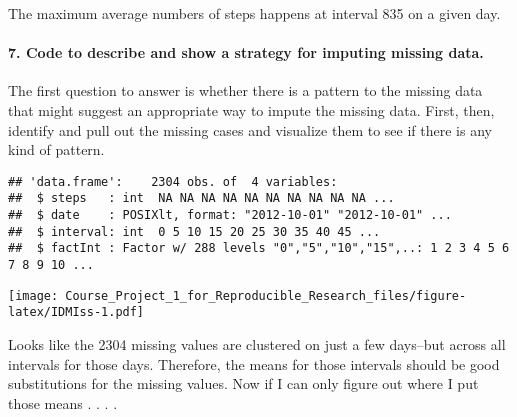 \documentclass[]{article}
\newenvironment{Shaded}{\begin{snugshade}}{\end{snugshade}}
\newcommand{\KeywordTok}[1]{\textcolor[rgb]{0.13,0.29,0.53}{\textbf{#1}}}
\newcommand{\DataTypeTok}[1]{\textcolor[rgb]{0.13,0.29,0.53}{#1}}
\newcommand{\StringTok}[1]{\textcolor[rgb]{0.31,0.60,0.02}{#1}}
\newcommand{\OperatorTok}[1]{\textcolor[rgb]{0.81,0.36,0.00}{\textbf{#1}}}
\newcommand{\NormalTok}[1]{#1}
\let\oldparagraph\paragraph
\renewcommand{\paragraph}[1]{\oldparagraph{#1}\mbox{}}
\begin{document}
The maximum average numbers of steps happens at interval 835 on a given
day.

\paragraph{7. Code to describe and show a strategy for imputing missing
data.}\label{code-to-describe-and-show-a-strategy-for-imputing-missing-data.}

The first question to answer is whether there is a pattern to the
missing data that might suggest an appropriate way to impute the missing
data. First, then, identify and pull out the missing cases and visualize
them to see if there is any kind of pattern.

\begin{Shaded}
\end{Shaded}

\begin{verbatim}
## 'data.frame':    2304 obs. of  4 variables:
##  $ steps   : int  NA NA NA NA NA NA NA NA NA NA ...
##  $ date    : POSIXlt, format: "2012-10-01" "2012-10-01" ...
##  $ interval: int  0 5 10 15 20 25 30 35 40 45 ...
##  $ factInt : Factor w/ 288 levels "0","5","10","15",..: 1 2 3 4 5 6 7 8 9 10 ...
\end{verbatim}

\begin{Shaded}
\end{Shaded}

\texttt{[image: Course\_Project\_1\_for\_Reproducible\_Research\_files/figure-latex/IDMIss-1.pdf]}

Looks like the 2304 missing values are clustered on just a few days--but
across all intervals for those days. Therefore, the means for those
intervals should be good substitutions for the missing values. Now if I
can only figure out where I put those means . . . .
\end{document}
